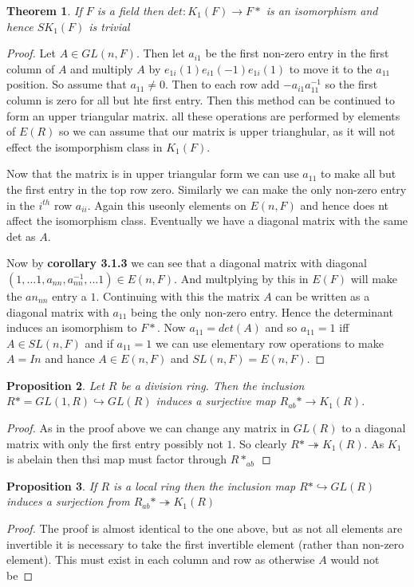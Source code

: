 \documentclass[a4paper,10pt]{article}
\newtheorem{thm}{Theorem}[subsection]
\newtheorem{prop}[thm]{Proposition}
\begin{document}
\begin{thm}
If $F$ is a field then $det:K_{1}(F)\rightarrow F*$ is an isomorphism and hence $SK_{1}(F)$ is trivial
\end{thm}
\begin{proof}
Let $A\in GL(n,F)$. Then let $a_{i1}$ be the first non-zero entry in the first column of $A$ and multiply $A$ by $e_{1i}(1)e_{i1}(-1)e_{1i}(1)$ to move it to the $a_{11}$ position. So assume that $a_{11}\neq 0$. Then to each row add $-a_{i1}a_{11}^{-1}$ so the first column is zero for all but hte first entry. Then this method can be continued to form an upper triangular matrix. all these operations are performed by elements of $E(R)$ so we can assume that our matrix is upper trianghular, as it will not effect the isomporphism class in $K_{1}(F)$.

Now that the matrix is in upper triangular form we can use $a_{11}$ to make all but the first entry in the top row zero. Similarly we can make the only non-zero entry in the $i^{th}$ row $a_{ii}$. Again this useonly elements on $E(n,F)$ and hence does nt affect the isomorphism class. Eventually we have a diagonal matrix with the same det as $A$.

Now by \textbf{corollary 3.1.3} we can see that a diagonal matrix with diagonal $(1,\ldots 1,a_{nn},a_{nn}^{-1},\ldots 1)\in E(n,F)$. And multplying by this in $E(F)$ will make the $an_{nn}$ entry a $1$. Continuing with this the matrix $A$ can be written as a diagonal matrix with $a_{11}$ being the only non-zero entry. Hence the determinant induces an isomorphism to $F*$. Now $a_{11}=det(A)$ and so $a_{11}=1$ iff $A\in SL(n,F)$ and if $a_{11}=1$ we can use elementary row operations to make $A=In$ and hance $A\in E(n,F)$ and $SL(n,F)=E(n,F)$.
\end{proof}

\begin{prop}
Let $R$ be a division ring. Then the inclusion $R*=GL(1,R)\hookrightarrow GL(R)$ induces a surjective map $R_{ab}*\rightarrow  K_{1}(R)$.
\end{prop}
\begin{proof}
As in the proof above  we can change any matrix in $GL(R)$ to a diagonal matrix with only the first entry possibly not $1$. So clearly $R*\twoheadrightarrow K_{1}(R)$. As $K_{1}$ is abelain then thsi map must factor through $R*_{ab}$
\end{proof}

\begin{prop}
If $R$ is a local ring then  the inclusion map $R*\hookrightarrow GL(R)$ induces a surjection from $R_{ab}*\twoheadrightarrow K_{1}(R)$
\end{prop}
\begin{proof}
The proof is almost identical to the one above, but as not all elements are invertible it is necessary to take the first invertible element (rather than non-zero element). This must exist in each column and row as otherwise $A$ would not be 
\end{proof}
\end{document}
